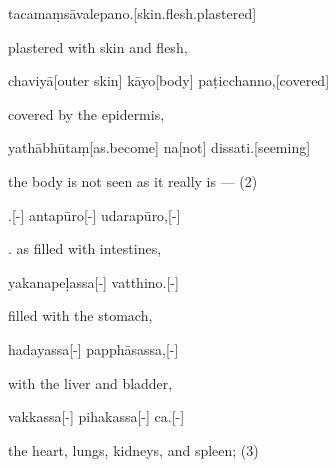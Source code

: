 \begin{samepage}
\begingl[glneveryline={\PaliGlossA,\PaliGlossB}]
tacamaṃsāvalepano.[skin.flesh.plastered]
\endgl
\nopagebreak
\linespread{0.5}
\begin{spacin}{0.2}
{\PaliGlossFT plastered with skin and flesh,}
\end{spacin}
\vskip 12pt
\end{samepage}
\begin{samepage}
\begingl[glneveryline={\PaliGlossA,\PaliGlossB}]
chaviyā[outer skin] kāyo[body] paṭicchanno,[covered]
\endgl
\nopagebreak
\linespread{0.5}
\begin{spacin}{0.2}
{\PaliGlossFT covered by the epidermis,}
\end{spacin}
\vskip 12pt
\end{samepage}
\begin{samepage}
\begingl[glneveryline={\PaliGlossA,\PaliGlossB}]
yathābhūtaṃ[as.become] na[not] dissati.[seeming]
\endgl
\nopagebreak
\linespread{0.5}
\begin{spacin}{0.2}
{\PaliGlossFT the body is not seen as it really is — (2)}
\end{spacin}
\vskip 12pt
\end{samepage}
\vskip 0.2in
\begin{samepage}
.[-] antapūro[-] udarapūro,[-]
\endgl
\nopagebreak
\linespread{0.5}
\begin{spacin}{0.2}
{. as filled with intestines,}
\end{spacin}
\vskip 12pt
\end{samepage}
\begin{samepage}
\begingl[glneveryline={\PaliGlossA,\PaliGlossB}]
yakanapeḷassa[-] vatthino.[-]
\endgl
\nopagebreak
\linespread{0.5}
\begin{spacin}{0.2}
{\PaliGlossFT filled with the stomach,}
\end{spacin}
\vskip 12pt
\end{samepage}
\begin{samepage}
\begingl[glneveryline={\PaliGlossA,\PaliGlossB}]
hadayassa[-] papphāsassa,[-]
\endgl
\nopagebreak
\linespread{0.5}
\begin{spacin}{0.2}
{\PaliGlossFT with the liver and bladder,}
\end{spacin}
\vskip 12pt
\end{samepage}
\begin{samepage}
\begingl[glneveryline={\PaliGlossA,\PaliGlossB}]
vakkassa[-] pihakassa[-] ca.[-]
\endgl
\nopagebreak
\linespread{0.5}
\begin{spacin}{0.2}
{\PaliGlossFT the heart, lungs, kidneys, and spleen; (3)}
\end{spacin}
\vskip 12pt
\end{samepage}
